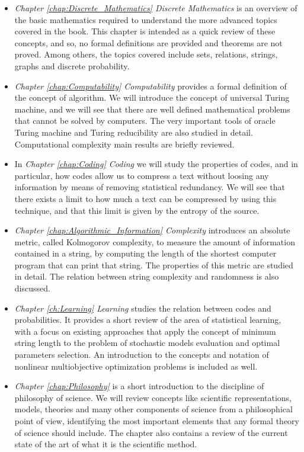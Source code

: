 \begin{itemize}

\item \emph{Chapter \ref{chap:Discrete_Mathematics} Discrete Mathematics} is an overview of the basic mathematics required to understand the more advanced topics covered in the book. This chapter is intended as a quick review of these concepts, and so, no formal definitions are provided and theorems are not proved. Among others, the topics covered include sets, relations, strings, graphs and discrete probability.

\item \emph{Chapter \ref{chap:Computability} Computability} provides a formal definition of the concept of algorithm. We will introduce the concept of universal Turing machine, and we will see that there are well defined mathematical problems that cannot be solved by computers. The very important tools of oracle Turing machine and Turing reducibility are also studied in detail. Computational complexity main results are briefly reviewed.

\item In \emph{Chapter \ref{chap:Coding} Coding} we will study the properties of codes, and in particular, how codes allow us to compress a text without loosing any information by means of removing statistical redundancy. We will see that there exists a limit to how much a text can be compressed by using this technique, and that this limit is given by the entropy of the source.

\item \emph{Chapter \ref{chap:Algorithmic_Information} Complexity} introduces an absolute metric, called Kolmogorov complexity, to measure the amount of information contained in a string, by computing the length of the shortest computer program that can print that string. The properties of this metric are studied in detail. The relation between string complexity and randomness is also discussed.

\item \emph{Chapter \ref{ch:Learning} Learning} studies the relation between codes and probabilities. It provides a short review of the area of statistical learning, with a focus on existing approaches that apply the concept of minimum string length to the problem of stochastic models evaluation and optimal parameters selection. An introduction to the concepts and notation of nonlinear multiobjective optimization problems is included as well. 

\item \emph{Chapter \ref{chap:Philosophy} } is a short introduction to the discipline of philosophy of science. We will review concepts like scientific representations, models, theories and many other components of science from a philosophical point of view, identifying the most important elements that any formal theory of science should include. The chapter also contains a review of the current state of the art of what it is the scientific method.

\end{itemize}

